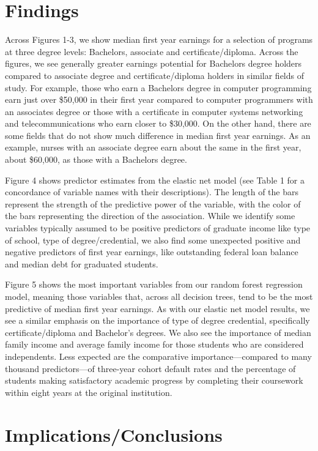 \documentclass[a4paper, 12pt]{article}
\begin{document}
\section*{Findings}

Across Figures 1-3, we show median first year earnings for a selection
of programs at three degree levels: Bachelors, associate and
certificate/diploma. Across the figures, we see generally greater
earnings potential for Bachelors degree holders compared to associate
degree and certificate/diploma holders in similar fields of study. For
example, those who earn a Bachelors degree in computer programming
earn just over \$50,000 in their first year compared to computer
programmers with an associates degree or those with a certificate in
computer systems networking and telecommunications who earn closer to
\$30,000. On the other hand, there are some fields that do not show
much difference in median first year earnings. As an example, nurses
with an associate degree earn about the same in the first year, about
\$60,000, as those with a Bachelors degree.

Figure 4 shows predictor estimates from the elastic net model (see
Table 1 for a concordance of variable names with their
descriptions). The length of the bars represent the strength of the
predictive power of the variable, with the color of the bars
representing the direction of the association. While we identify some
variables typically assumed to be positive predictors of graduate
income like type of school, type of degree/credential, we also find
some unexpected positive and negative predictors of first year
earnings, like outstanding federal loan balance and median debt for
graduated students.

Figure 5 shows the most important variables from our random forest
regression model, meaning those variables that, across all decision
trees, tend to be the most predictive of median first year
earnings. As with our elastic net model results, we see a similar
emphasis on the importance of type of degree credential, specifically
certificate/diploma and Bachelor's degrees. We also see the importance
of median family income and average family income for those students
who are considered independents. Less expected are the comparative
importance---compared to many thousand predictors---of three-year
cohort default rates and the percentage of students making
satisfactory academic progress by completing their coursework within
eight years at the original institution.

\section*{Implications/Conclusions}
\end{document}
